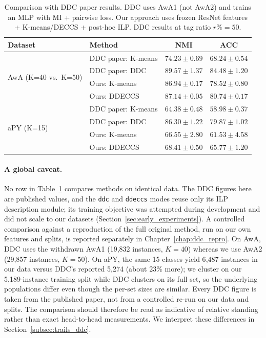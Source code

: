 \begin{table}[H]
    \centering
    \caption{Comparison with DDC paper results. DDC uses AwA1 (not AwA2) and trains an MLP with MI + pairwise loss. Our approach uses frozen ResNet features + K-means/DECCS + post-hoc ILP. DDC results at tag ratio $r\% = 50$.}
    \label{tab:ddc_comparison}
    \begin{tabular}{llcc}
        \hline
        \textbf{Dataset} & \textbf{Method} & \textbf{NMI} & \textbf{ACC} \\
        \hline
        \multirow{4}{*}{AwA (K=40 vs.\ K=50)} & DDC paper: K-means & $74.23 \pm 0.69$ & $68.24 \pm 0.54$ \\
        & DDC paper: DDC & $89.57 \pm 1.37$ & $84.48 \pm 1.20$ \\
        & Ours: K-means & $86.94 \pm 0.17$ & $78.52 \pm 0.80$ \\
        & Ours: DDECCS & $87.14 \pm 0.05$ & $80.74 \pm 0.17$ \\
        \hline
        \multirow{4}{*}{aPY (K=15)} & DDC paper: K-means & $64.38 \pm 0.48$ & $58.98 \pm 0.37$ \\
        & DDC paper: DDC & $86.30 \pm 1.22$ & $79.87 \pm 1.02$ \\
        & Ours: K-means & $66.55 \pm 2.80$ & $61.53 \pm 4.58$ \\
        & Ours: DDECCS & $68.41 \pm 0.50$ & $65.77 \pm 1.20$ \\
        \hline
    \end{tabular}
\end{table}


\paragraph{A global caveat.} No row in Table~\ref{tab:ddc_comparison} compares methods on identical data. The DDC figures here are published values, and the \texttt{ddc} and \texttt{ddeccs} modes reuse only its ILP description module; its training objective was attempted during development and did not scale to our datasets (Section~\ref{sec:early_experiments}). A controlled comparison against a reproduction of the full original method, run on our own features and splits, is reported separately in Chapter~\ref{chap:ddc_repro}. On AwA, DDC uses the withdrawn AwA1 (19{,}832 instances, $K=40$) whereas we use AwA2 (29{,}857 instances, $K=50$). On aPY, the same 15 classes yield 6{,}487 instances in our data versus DDC's reported 5{,}274 (about 23\% more); we cluster on our 5{,}189-instance training split while DDC clusters on its full set, so the underlying populations differ even though the per-set sizes are similar. Every DDC figure is taken from the published paper, not from a controlled re-run on our data and splits. The comparison should therefore be read as indicative of relative standing rather than exact head-to-head measurements. We interpret these differences in Section~\ref{subsec:trails_ddc}.

